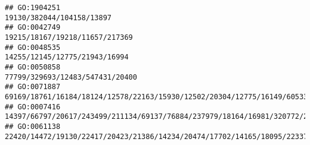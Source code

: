 \documentclass[
]{article}
\begin{document}
\begin{verbatim}
## GO:1904251                                                                                                                                                                                                                                                                                                                                                                                    19130/382044/104158/13897
## GO:0042749                                                                                                                                                                                                                                                                                                                                                                               19215/18167/19218/11657/217369
## GO:0048535                                                                                                                                                                                                                                                                                                                                                                                14255/12145/12775/21943/16994
## GO:0050858                                                                                                                                                                                                                                                                                                                                                                              77799/329693/12483/547431/20400
## GO:0071887                                                                                                                                                                                                                                                                                                                                      69169/18761/16184/18124/12578/22163/15930/12502/20304/12775/16149/60533
## GO:0007416                                                                                                                                                                                                                                                                                            14397/66797/20617/243499/211134/69137/76884/237979/18164/16981/320772/20474/19876/77596/12405/574437/236915/70237
## GO:0061138                                                                                                                                                                                                                                                                                                                   22420/14472/19130/22417/20423/21386/14234/20474/17702/14165/18095/22337/21380/104156/12705

\end{verbatim}
\end{document}
